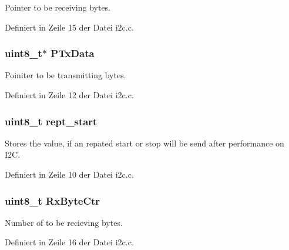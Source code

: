 Pointer to be receiving bytes. 



Definiert in Zeile 15 der Datei i2c.\+c.

\hypertarget{struct_i2_c___c_t_r_l_af294cab6f89af5bd936b709e202c8421}{}
\subsubsection[{P\+Tx\+Data}]{\setlength{\rightskip}{0pt plus 5cm}uint8\+\_\+t$\ast$ P\+Tx\+Data}\label{struct_i2_c___c_t_r_l_af294cab6f89af5bd936b709e202c8421}


Poiniter to be transmitting bytes. 



Definiert in Zeile 12 der Datei i2c.\+c.

\hypertarget{struct_i2_c___c_t_r_l_a374bcaa6a416b8601564a1053ddf78bb}{}
\subsubsection[{rept\+\_\+start}]{\setlength{\rightskip}{0pt plus 5cm}uint8\+\_\+t rept\+\_\+start}\label{struct_i2_c___c_t_r_l_a374bcaa6a416b8601564a1053ddf78bb}


Stores the value, if an repated start or stop will be send after performance on I2\+C. 



Definiert in Zeile 10 der Datei i2c.\+c.

\hypertarget{struct_i2_c___c_t_r_l_a37e493c5b47477e45136924079fd9606}{}
\subsubsection[{Rx\+Byte\+Ctr}]{\setlength{\rightskip}{0pt plus 5cm}uint8\+\_\+t Rx\+Byte\+Ctr}\label{struct_i2_c___c_t_r_l_a37e493c5b47477e45136924079fd9606}


Number of to be recieving bytes. 



Definiert in Zeile 16 der Datei i2c.\+c.

